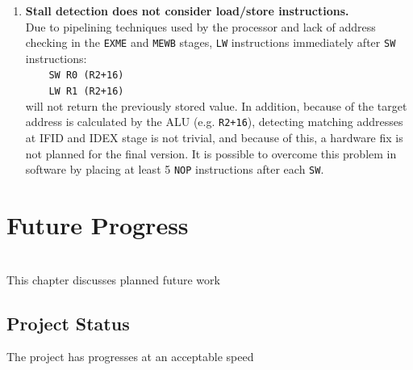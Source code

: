 \documentclass[11pt,a4paper]{report}
\begin{document}
{\begin{enumerate}[leftmargin=3\parindent, label=\bfseries BUG\arabic*, style=nextline]
\item{\textbf{Stall detection does not consider load/store instructions.}\\
Due to pipelining techniques used by the processor and lack of address checking in the \verb|EXME| and \verb|MEWB| stages, \verb|LW| instructions immediately after \verb|SW| instructions:\\ \verb|    SW R0 (R2+16)|\\ \verb|    LW R1 (R2+16)|\\
will not return the previously stored value. In addition, because of the target address is calculated by the ALU (e.g. \verb|R2+16|), detecting matching addresses at IFID and IDEX stage is not trivial, and because of this, a hardware fix is not planned for the final version. It is possible to overcome this problem in software by placing at least 5 \verb|NOP| instructions after each \verb|SW|. 
}\label{bug:swlw}
\end{enumerate}


\chapter{Future Progress}

{\hypersetup{linkcolor=black}
\startcontents[chapters]
}
\noindent\\
This chapter discusses planned future work

\section{Project Status}
The project has progresses at an acceptable speed

}
\end{document}
